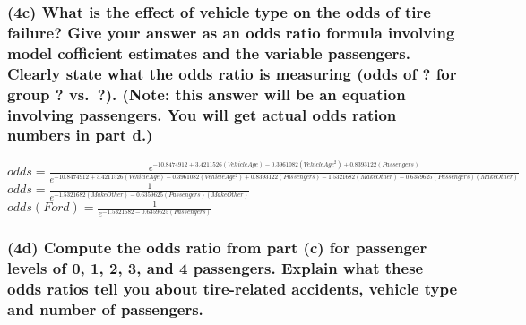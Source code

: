 \documentclass[
]{article}
\begin{document}
\hypertarget{c-what-is-the-effect-of-vehicle-type-on-the-odds-of-tire-failure-give-your-answer-as-an-odds-ratio-formula-involving-model-cofficient-estimates-and-the-variable-passengers.-clearly-state-what-the-odds-ratio-is-measuring-odds-of-for-group-vs.-.-note-this-answer-will-be-an-equation-involving-passengers.-you-will-get-actual-odds-ration-numbers-in-part-d.}{%
\subsubsection{(4c) What is the effect of vehicle type on the odds of
tire failure? Give your answer as an odds ratio formula involving model
cofficient estimates and the variable passengers. Clearly state what the
odds ratio is measuring (odds of ? for group ? vs.~?). (Note: this
answer will be an equation involving passengers. You will get actual
odds ration numbers in part
d.)}\label{c-what-is-the-effect-of-vehicle-type-on-the-odds-of-tire-failure-give-your-answer-as-an-odds-ratio-formula-involving-model-cofficient-estimates-and-the-variable-passengers.-clearly-state-what-the-odds-ratio-is-measuring-odds-of-for-group-vs.-.-note-this-answer-will-be-an-equation-involving-passengers.-you-will-get-actual-odds-ration-numbers-in-part-d.}}

\(odds = \frac{e^{-10.8474912 + 3.4211526(VehicleAge) - 0.3961082(VehicleAge^2) + 0.8393122(Passengers)}}{e^{-10.8474912 + 3.4211526(VehicleAge) - 0.3961082(VehicleAge^2) + 0.8393122(Passengers) - 1.5321682(MakeOther) - 0.6359625(Passengers)(MakeOther)}}\)
\newline
\(odds = \frac{1}{e^{-1.5321682(MakeOther) - 0.6359625(Passengers)(MakeOther)}}\)
\newline
\(odds(Ford) = \frac{1}{e^{-1.5321682 - 0.6359625(Passengers)}}\)

\hypertarget{d-compute-the-odds-ratio-from-part-c-for-passenger-levels-of-0-1-2-3-and-4-passengers.-explain-what-these-odds-ratios-tell-you-about-tire-related-accidents-vehicle-type-and-number-of-passengers.}{%
\subsubsection{(4d) Compute the odds ratio from part (c) for passenger
levels of 0, 1, 2, 3, and 4 passengers. Explain what these odds ratios
tell you about tire-related accidents, vehicle type and number of
passengers.}\label{d-compute-the-odds-ratio-from-part-c-for-passenger-levels-of-0-1-2-3-and-4-passengers.-explain-what-these-odds-ratios-tell-you-about-tire-related-accidents-vehicle-type-and-number-of-passengers.}}
\end{document}
